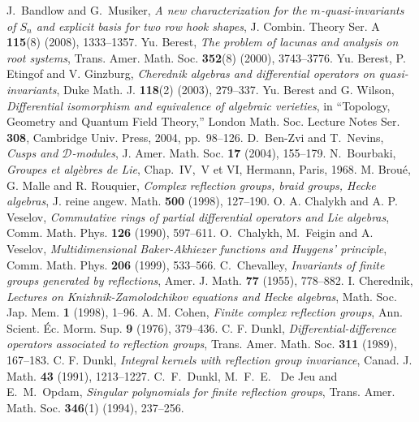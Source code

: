 \documentclass{amsart}
\theoremstyle{definition}
\theoremstyle{remark}
\numberwithin{equation}{section}
\begin{document}

\begin{thebibliography}{A}
J.~Bandlow and G.~Musiker,
\textit{A new characterization for the $m$-quasi-invariants of $S_n$ and
explicit basis for two row hook shapes}, J. Combin. Theory
Ser. A \textbf{115}(8) (2008), 1333--1357.
Yu. Berest, \textit{The problem of lacunas and analysis on root systems},
Trans. Amer. Math. Soc. \textbf{352}(8) (2000), 3743--3776.
Yu. Berest, P. Etingof and V. Ginzburg, \textit{Cherednik algebras
and differential operators on quasi-invariants}, Duke Math. J.
\textbf{118}(2) (2003), 279--337.
Yu. Berest and G. Wilson, \textit{Differential isomorphism and
equivalence of algebraic verieties}, in ``Topology, Geometry and Quantum Field Theory,''
London Math. Soc. Lecture Notes Ser. \textbf{308}, Cambridge Univ. Press, 2004,
pp.~98--126.
D.~Ben-Zvi and T.~Nevins, \textit{Cusps and ${\mathcal{D}}$-modules},
J. Amer. Math. Soc. \textbf{17} (2004), 155--179.
N.~Bourbaki, \textit{Groupes et alg\`ebres de Lie},
Chap.~IV,\, V et VI, Hermann, Paris, 1968.
M. Brou\'e, G. Malle and R. Rouquier, \textit{Complex reflection groups, braid groups,
Hecke algebras}, J. reine angew. Math. \textbf{500} (1998), 127--190.
O. A. Chalykh and A. P. Veselov, \textit{Commutative rings of
partial differential operators  and  Lie  algebras}, Comm.  Math.
Phys. \textbf{126} (1990), 597--611.
O.~Chalykh, M.~Feigin and A. Veselov, \textit{Multidimensional Baker-Akhiezer
functions and Huygens' principle}, Comm. Math. Phys. \textbf{206} (1999), 533--566.
C.~Chevalley, \textit{Invariants of finite groups generated by reflections},
Amer. J. Math. \textbf{77} (1955), 778--882.
I. Cherednik, \textit{Lectures on Knizhnik-Zamolodchikov equations and Hecke algebras},
Math. Soc. Jap. Mem. \textbf{1} (1998), 1--96.
A. M. Cohen, \textit{Finite complex reflection groups}, Ann. Scient. \'Ec. Morm. Sup.
\textbf{9} (1976), 379--436.
C. F. Dunkl, \textit{Differential-difference operators associated
to reflection groups}, Trans. Amer. Math. Soc. \textbf{311} (1989), 167--183.
C. F. Dunkl, \textit{Integral kernels with reflection group invariance},
Canad. J. Math. \textbf{43} (1991), 1213--1227.
C.~F.~Dunkl, M.~F.~E.~ De Jeu and E.~M.~Opdam, \textit{Singular polynomials for finite reflection groups}, Trans. Amer. Math. Soc. \textbf{346}(1) (1994), 237--256.

\end{thebibliography}
\end{document}
